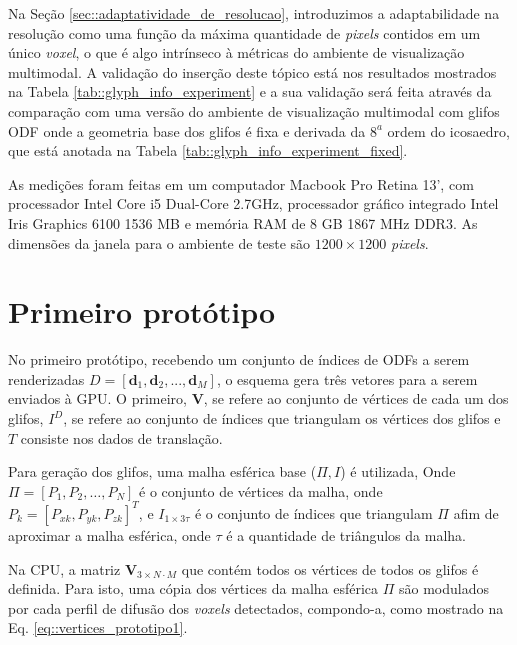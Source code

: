 \documentclass[
    12pt,                %
    oneside,            %
    a4paper,            %
    english,            %
    french,                %
    spanish,            %
    brazil                %
    ]{abntex2}
\begin{document}
Na Seção \ref{sec::adaptatividade_de_resolucao}, introduzimos a adaptabilidade na resolução como uma função da máxima quantidade de \textit{pixels} contidos em um único \textit{voxel}, o que é algo intrínseco à métricas do ambiente de visualização multimodal. A validação do inserção deste tópico está nos resultados mostrados na Tabela \ref{tab::glyph_info_experiment} e a sua validação será feita através da comparação com uma versão do ambiente de visualização multimodal com glifos ODF onde a geometria base dos glifos é fixa e derivada da $8^a$ ordem do icosaedro, que está anotada na Tabela \ref{tab::glyph_info_experiment_fixed}.

As medições foram feitas em um computador Macbook Pro Retina 13', com processador Intel Core i5 Dual-Core 2.7GHz, processador gráfico integrado Intel Iris Graphics 6100 1536 MB e memória RAM de 8 GB 1867 MHz DDR3. As dimensões da janela para o ambiente de teste são $1200 \times 1200$ \textit{pixels}.



\section{Primeiro protótipo}
\label{sec::primeiro_prototipo}

No primeiro protótipo, recebendo um conjunto de índices de ODFs a serem renderizadas $D = [
\mathbf{d}_1,
\mathbf{d}_2, ..., 
\mathbf{d}_M
]$, o esquema gera três vetores para a serem enviados à GPU. O primeiro, $\mathbf{V}$, se refere ao conjunto de vértices de cada um dos glifos, $I^D$, se refere ao conjunto de índices que triangulam os vértices dos glifos e $T$ consiste nos dados de translação.

Para geração dos glifos, uma malha esférica base ($\Pi, I$) é utilizada, Onde $\Pi = [P_1, P_2, \dots, P_N]$ é o conjunto de vértices da malha, onde $P_k = [P_{xk}, P_{yk}, P_{zk}]^T$, e $I_{1\times 3\tau}$ é o conjunto de índices que triangulam $\Pi$ afim de aproximar a malha esférica, onde $\tau$ é a quantidade de triângulos da malha.


Na CPU, a matriz $\mathbf{V}_{3\times N\cdot M}$ que contém todos os vértices de todos os glifos é definida. Para isto, uma cópia dos vértices da malha esférica $\Pi$ são modulados por cada perfil de difusão dos \textit{voxels} detectados, compondo-a, como mostrado na Eq. \ref{eq::vertices_prototipo1}.
\end{document}
